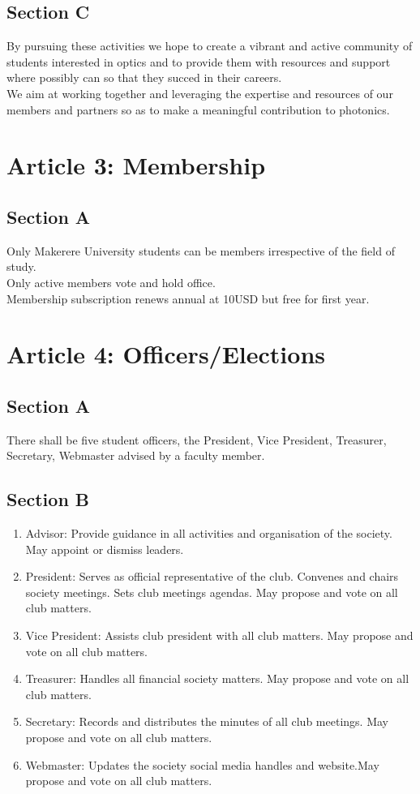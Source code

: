 \documentclass[a4paper,14pt]{article}
\begin{document}
    \subsection*{Section C}%
    By pursuing these activities we hope to create a vibrant and active community of students interested in optics and to provide them with resources and support where possibly can so that they succed in their careers. \\
    We aim at working together and leveraging the expertise and resources of our members and partners so as to make a meaningful contribution to photonics.

    \section*{Article 3: Membership}
    \subsection*{Section A}
    Only Makerere University students can be members irrespective of the field of study.\\
    Only active members vote and hold office.\\
    Membership subscription renews annual at 10USD but free for first year.\\

    \section*{Article 4: Officers/Elections}
    \subsection*{Section A}
    There shall be five student officers, the President, Vice President, Treasurer, Secretary, Webmaster advised by a faculty member.
    \subsection*{Section B}
    \begin{enumerate}
        \item Advisor: Provide guidance in all activities and organisation of the society. May appoint or dismiss leaders.
        \item President: Serves as official representative of the club. Convenes and chairs society meetings. Sets club meetings agendas. May propose and vote on all club matters.
        \item Vice President: Assists club president with all club matters. May propose and vote on all club matters.
        \item Treasurer: Handles all financial society matters. May propose and vote on all club matters.
        \item Secretary: Records and distributes the minutes of all club meetings. May propose and vote on all club matters.
        \item Webmaster: Updates the society social media handles and website.May propose and vote on all club matters.
    \end{enumerate}
\end{document}
